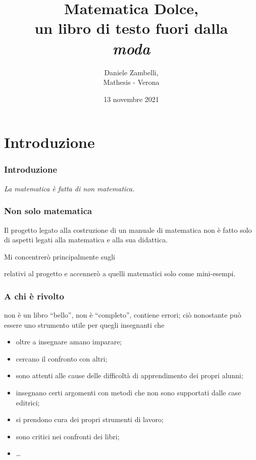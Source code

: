 \documentclass{beamer} %
\title{Matematica Dolce,\\ 
un libro di testo fuori dalla \\
\emph{moda}}
\date{13 novembre 2021\\[2em] 
\scalebox{.5}{\texttt{[image: by-sa.png]}}}
\author{Daniele Zambelli, \\
Mathesis - Verona
}
\begin{document}
\initslides

\section{Introduzione}


\begin{frame}\frametitle{Introduzione}

\begin{center}  \end{center}

\vspace{20mm}
\begin{flushright}
\emph{La matematica è fatta di non matematica.}
\end{flushright}

\end{frame}


\begin{frame}\frametitle{Non solo matematica}

Il progetto legato alla costruzione di un manuale di matematica non è 
fatto solo di aspetti legati alla matematica e alla sua didattica. 

\bigskip
\pause
Mi concentrerò principalmente sugli 
\begin{center} \end{center}
relativi al progetto  e accennerò a quelli 
matematici solo come mini-esempi.

\end{frame}


\begin{frame}\frametitle{A chi è rivolto}

\md non è un libro ``bello'', non è ``completo'', contiene errori;
ciò nonostante può essere uno strumento utile per quegli insegnanti che

\bigskip
\begin{itemize} [<+->]
\item oltre a insegnare amano imparare;
\item cercano il confronto con altri;
\item sono attenti alle cause delle difficoltà di apprendimento dei propri 
alunni;
\item insegnano certi argomenti con metodi che non sono supportati dalle case 
editrici;
\item si prendono cura dei propri strumenti di lavoro;
\item sono critici nei confronti dei libri;
\item \dots
\end{itemize}

\end{frame}
\end{document}
